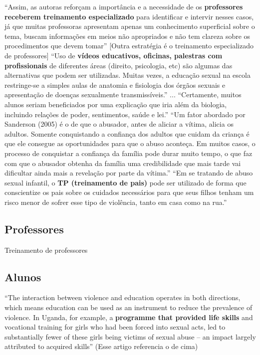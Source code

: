   
``Assim, as autoras reforçam a importância e a necessidade de os \textbf{professores receberem treinamento especializado} para identificar e intervir nesses casos, já que muitas professoras apresentam apenas um conhecimento superficial sobre o tema, buscam informações em meios não apropriados e não tem clareza sobre os procedimentos que devem tomar'' [Outra estratégia é o treinamento especializado de professores] ``Uso de \textbf{vídeos educativos, oficinas, palestras com profissionais} de diferentes áreas (direito, psicologia, etc) são algumas das alternativas que podem ser utilizadas. Muitas vezes, a educação sexual na escola restringe-se a simples aulas de anatomia e fisiologia dos órgãos sexuais e apresentação de doenças sexualmente transmissíveis.'' ... ``Certamente, muitos alunos seriam beneficiados por uma explicação que iria além da biologia, incluindo relações de poder, sentimentos, saúde e lei.'' ``Um fator abordado por Sanderson (2005) é o de que o abusador, antes de aliciar a vítima, alicia os adultos. Somente conquistando a confiança dos adultos que cuidam da criança é que ele consegue as oportunidades para que o abuso aconteça. Em muitos casos, o processo de conquistar a confiança da família pode durar muito tempo, o que faz com que o abusador obtenha da família uma credibilidade que mais tarde vai dificultar ainda mais a revelação por parte da vítima.'' ``Em se tratando de abuso sexual infantil, o \textbf{TP (treinamento de pais)} pode ser utilizado de forma que conscientize os pais sobre os cuidados necessários para que seus filhos tenham um risco menor de sofrer esse tipo de violência, tanto em casa como na rua.'' \cite{pelisoli2010prevenccao}






\subsection{Professores}\label{ssec:professores}

Treinamento de professores

\subsection{Alunos}\label{ssec:alunos}

``The interaction between violence and education operates in both directions, which means education can be used as an instrument to reduce the prevalence of violence. In Uganda, for example, a \textbf{programme that provided life skills} and vocational training for girls who had been forced into sexual acts, led to substantially fewer of these girls being victims of sexual abuse – an impact largely attributed to acquired skills''  \cite{owidviolenceagainstrightsforchildren} (Esse artigo referencia o de cima)


